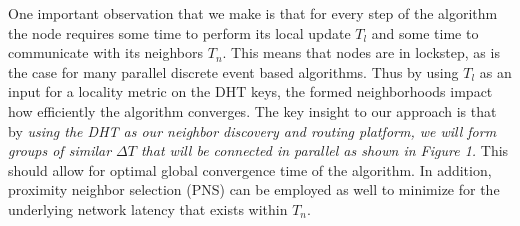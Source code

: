 \documentclass[12pt,notitlepage]{article}
\begin{document}
One important observation that we make is that for every step of the algorithm
the node requires some time to perform its local update $T_{l}$ and 
some time to communicate with its neighbors $T_{n}$. This means that nodes
are in lockstep, as is the case for many parallel discrete event based 
algorithms.  Thus by using $T_{l}$ as an input for a locality metric on the DHT
 keys, the formed neighborhoods impact how efficiently the algorithm
converges. The key insight to our approach is that by {\it using the DHT as
our neighbor discovery and routing platform, we will form groups of similar 
$\Delta T$ that will be connected in parallel as shown in Figure 1.}
This should allow for optimal global convergence time of the algorithm.
In addition, proximity neighbor selection (PNS) 
can be employed as well to minimize for the underlying network latency 
that exists within $T_{n}$. 
\end{document}
